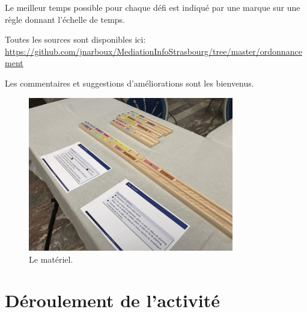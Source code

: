 \documentclass[a4paper]{article}
\begin{document}
Le meilleur temps possible pour chaque défi est indiqué par une marque sur une règle donnant l'échelle de temps.

Toutes les sources sont disponibles ici:
\url{https://github.com/jnarboux/MediationInfoStrasbourg/tree/master/ordonnancement}

Les commentaires et suggestions d'améliorations sont les bienvenus.

\begin{figure}
\begin{center}
\includegraphics[width=0.8\textwidth]{photo_materiel.jpg}
\end{center}
\caption{Le matériel.}
\end{figure}

\section{Déroulement de l'activité}
\end{document}
